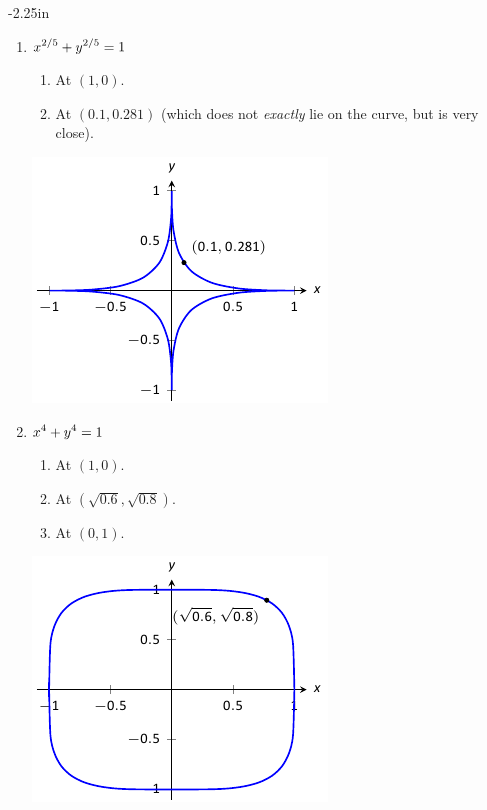 \begin{adjustwidth*}{}{-2.25in}
\begin{multicols*}{2}
\begin{enumerate}[1),resume]
\item $\displaystyle x^{2/5}+y^{2/5} = 1$
\begin{enumerate}
\item	At $(1,0)$.
\item	At $(0.1,0.281)$ (which does not \textit{exactly} lie on the curve, but is very close).
\end{enumerate}
\includegraphics[scale=.8]{figures/fig02_06_ex_23}

\item $\displaystyle x^{4}+y^{4} = 1$
\begin{enumerate}
\item	At $(1,0)$.
\item	At $(\sqrt{0.6},\sqrt{0.8})$.
\item	At $(0,1)$.
\end{enumerate}
\includegraphics[scale=.8]{figures/fig02_06_ex_24}


\end{enumerate}
\end{multicols*}
\end{adjustwidth*}
